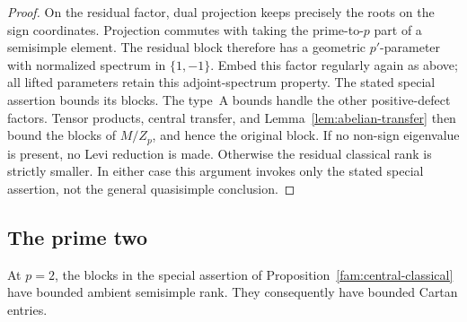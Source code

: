 \begin{proof}
On the residual factor, dual projection keeps precisely the roots
on the sign coordinates.  Projection commutes with taking the
prime-to-\(p\) part of a semisimple element.  The residual block
therefore has a geometric \(p'\)-parameter with normalized spectrum
in \(\{1,-1\}\).  Embed this factor regularly again as above;
all lifted parameters retain this adjoint-spectrum property.
The stated special assertion bounds its blocks.  The type~A
bounds handle the other positive-defect factors.  Tensor products,
central transfer, and Lemma~\ref{lem:abelian-transfer} then bound
the blocks of \(M/Z_p\), and hence the original block.
If no non-sign eigenvalue is present, no Levi reduction is made.
Otherwise the residual classical rank is strictly smaller.  In
either case this argument invokes only the stated special
assertion, not the general quasisimple conclusion.
\end{proof}

\subsection{The prime two}

\begin{proposition}\label{fam:two}
At \(p=2\), the blocks in the special assertion of
Proposition~\ref{fam:central-classical} have bounded ambient
semisimple rank.  They consequently have bounded Cartan entries.
\end{proposition}

